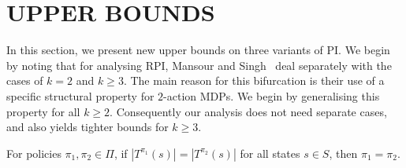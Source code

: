 \section{UPPER BOUNDS}
\label{sec:upperbounds}

In this section, we present new upper bounds on three variants of PI. We begin by noting that for analysing RPI, Mansour and Singh~ deal separately with the cases of $k = 2$ and $k \geq 3$. The main reason for this bifurcation is their use of a specific structural property for $2$-action MDPs. We begin by generalising this property for all $k \geq 2$. Consequently our analysis does not need separate cases, and also yields tighter bounds for $k \geq 3$.



\begin{lemma}
\label{lem:bijection}
    For policies $\pi_1, \pi_2 \in \Pi$, if $|T^{\pi_1}(s)|=|T^{\pi_2}(s)|$ for all states $s \in S$, then $\pi_1=\pi_2$.
\end{lemma}

